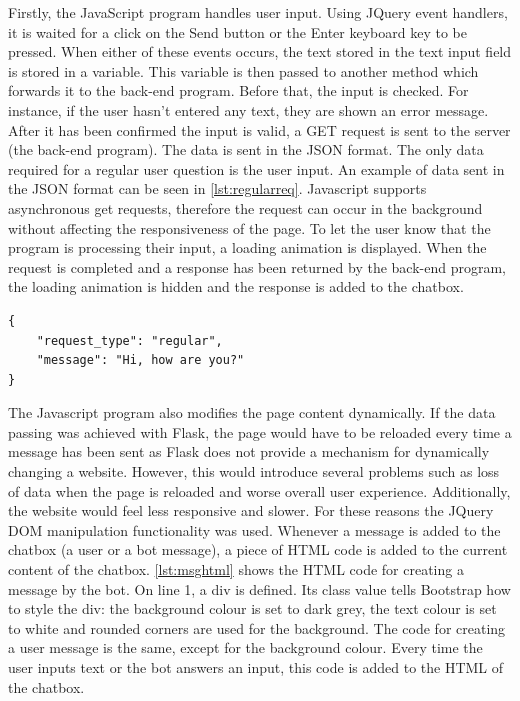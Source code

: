\documentclass[12pt,a4paper]{article}
\newcommand{\captionstyle}[1] {
    \small{#1}
}
\begin{document}
Firstly, the JavaScript program handles user input. Using JQuery event handlers, it is waited for a click on the Send button or the Enter keyboard key to be pressed. When either of these events occurs, the text stored in the text input field is stored in a variable. This variable is then passed to another method which forwards it to the back-end program. Before that, the input is checked. For instance, if the user hasn’t entered any text, they are shown an error message. After it has been confirmed the input is valid, a GET request is sent to the server (the back-end program). The data is sent in the JSON format. The only data required for a regular user question is the user input. An example of data sent in the JSON format can be seen in \cref{lst:regularreq}. Javascript supports asynchronous get requests, therefore the request can occur in the background without affecting the responsiveness of the page. To let the user know that the program is processing their input, a loading animation is displayed. When the request is completed and a response has been returned by the back-end program, the loading animation is hidden and the response is added to the chatbox.   

\begin{lstlisting}[caption={\captionstyle{Example data sent to the back-end for processing in the JSON format.}}, label={lst:regularreq}]
{
    "request_type": "regular",
    "message": "Hi, how are you?"
}
\end{lstlisting}

The Javascript program also modifies the page content dynamically. If the data passing was achieved with Flask, the page would have to be reloaded every time a message has been sent as Flask does not provide a mechanism for dynamically changing a website. However, this would introduce several problems such as loss of data when the page is reloaded and worse overall user experience. Additionally, the website would feel less responsive and slower. For these reasons the JQuery DOM manipulation functionality was used. Whenever a message is added to the chatbox (a user or a bot message), a piece of HTML code is added to the current content of the chatbox. \cref{lst:msghtml} shows the HTML code for creating a message by the bot. On line 1, a div is defined. Its class value tells Bootstrap how to style the div: the background colour is set to dark grey, the text colour is set to white and rounded corners are used for the background. The code for creating a user message is the same, except for the background colour. Every time the user inputs text or the bot answers an input, this code is added to the HTML of the chatbox.
\end{document}
